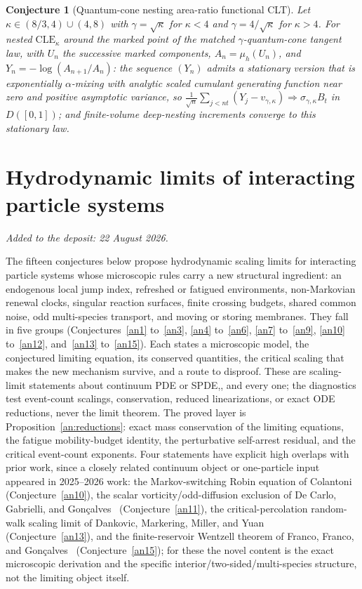 \documentclass[11pt]{article}
\newtheorem{conjecture}{Conjecture}
\theoremstyle{definition}
\begin{document}
\begin{conjecture}[Quantum-cone nesting area-ratio functional CLT]\label{am13}
Let \(\kappa\in(8/3,4)\cup(4,8)\) with \(\gamma=\sqrt\kappa\) for \(\kappa<4\) and \(\gamma=4/\sqrt\kappa\) for \(\kappa>4\).  For nested \(\mathrm{CLE}_\kappa\) around the marked point of the matched \(\gamma\)-quantum-cone tangent law, with \(U_n\) the successive marked components, \(A_n=\mu_h(U_n)\), and \(Y_n=-\log(A_{n+1}/A_n)\): the sequence \((Y_n)\) admits a stationary version that is exponentially \(\alpha\)-mixing with analytic scaled cumulant generating function near zero and positive asymptotic variance, so \(\tfrac1{\sqrt n}\sum_{j<nt}(Y_j-v_{\gamma,\kappa})\Rightarrow\sigma_{\gamma,\kappa}B_t\) in \(D([0,1])\); and finite-volume deep-nesting increments converge to this stationary law.
\end{conjecture}


\part{Hydrodynamic limits of interacting particle systems}

\medskip\noindent\emph{Added to the deposit: 22 August 2026.}\par\medskip

The fifteen conjectures below propose hydrodynamic scaling limits for interacting particle systems whose microscopic rules carry a new structural ingredient: an endogenous local jump index, refreshed or fatigued environments, non-Markovian renewal clocks, singular reaction surfaces, finite crossing budgets, shared common noise, odd multi-species transport, and moving or storing membranes.  They fall in five groups (Conjectures~\ref{an1} to~\ref{an3}, \ref{an4} to~\ref{an6}, \ref{an7} to~\ref{an9}, \ref{an10} to~\ref{an12}, and~\ref{an13} to~\ref{an15}).  Each states a microscopic model, the conjectured limiting equation, its conserved quantities, the critical scaling that makes the new mechanism survive, and a route to disproof.  These are scaling-limit statements about continuum PDE or SPDE,, and every one; the diagnostics test event-count scalings, conservation, reduced linearizations, or exact ODE reductions, never the limit theorem.  The proved layer is Proposition~\ref{an:reductions}: exact mass conservation of the limiting equations, the fatigue mobility-budget identity, the perturbative self-arrest residual, and the critical event-count exponents.  Four statements have explicit high overlaps with prior work, since a closely related continuum object or one-particle input appeared in 2025--2026 work: the Markov-switching Robin equation of Colantoni~\cite{Colantoni26} (Conjecture~\ref{an10}), the scalar vorticity/odd-diffusion exclusion of De Carlo, Gabrielli, and Gon\c calves~\cite{DeCarloGabrielliGoncalves25} (Conjecture~\ref{an11}), the critical-percolation random-walk scaling limit of Dankovic, Markering, Miller, and Yuan~\cite{DankovicMMY26} (Conjecture~\ref{an13}), and the finite-reservoir Wentzell theorem of Franco, Franco, and Gon\c calves~\cite{FrancoFrancoGoncalves26} (Conjecture~\ref{an15}); for these the novel content is the exact microscopic derivation and the specific interior/two-sided/multi-species structure, not the limiting object itself.
\end{document}
